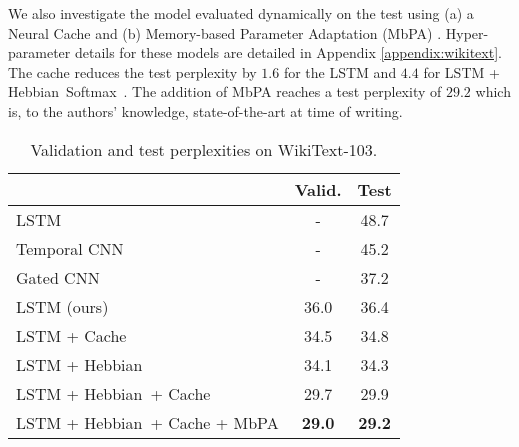 \documentclass{article} \usepackage{hyperref}
\newcommand{\model}{\hbox{Hebbian Softmax }}
\newcommand{\shortmodel}{\hbox{Hebbian }}
\begin{document}
We also investigate the model evaluated dynamically on the test using (a) a Neural Cache \citep{grave2016improving} and (b) Memory-based Parameter Adaptation (MbPA) \citep{sprechmann2018memorybased}. Hyper-parameter details for these models are detailed in Appendix \ref{appendix:wikitext}. The cache reduces the test perplexity by $1.6$ for the LSTM and $4.4$ for LSTM + \model. The addition of MbPA reaches a test perplexity of $29.2$ which is, to the authors' knowledge, state-of-the-art at time of writing.
\begin{table}
    \centering
    \caption{Validation and test perplexities on WikiText-103.}
    \begin{tabular}{lc c}
    \toprule
    & Valid. & Test \\
    \midrule
    LSTM \cite{graves2014neural} & - & 48.7 \\
    Temporal CNN \cite{bai2018convolutional} & - & 45.2 \\
    Gated CNN \cite{dauphin2016language} & - & 37.2 \\ 
    LSTM (ours) & 36.0 & 36.4 \\
    LSTM + Cache & 34.5 & 34.8 \\
    LSTM  + \shortmodel & 34.1 & 34.3 \\
    LSTM + \shortmodel + Cache & 29.7 & 29.9 \\ 
    LSTM + \shortmodel + Cache + MbPA & \textbf{29.0} & \textbf{29.2} \\
    \bottomrule
    \end{tabular}
    \label{tab:wiki}
\end{table}
\end{document}
